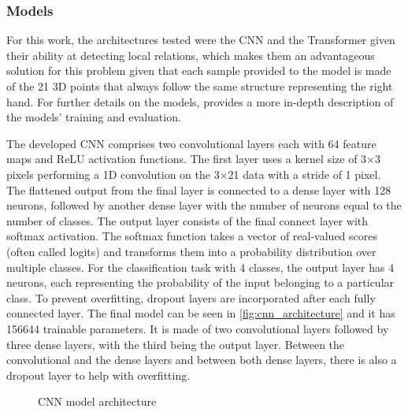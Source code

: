 \subsubsection{Models}

For this work, the architectures tested were the CNN and the Transformer given their ability at detecting local relations, which makes them an advantageous solution for this problem given that each sample provided to the model is made of the 21 3D points that always follow the same structure representing the right hand. For further details on the models, \textcite{Amaral2023} provides a more in-depth description of the models' training and evaluation.


The developed CNN comprises two convolutional layers each with 64 feature maps and ReLU activation functions.
The first layer uses a kernel size of 3$\times$3 pixels performing a 1D convolution on the 3$\times$21 data with a stride of 1 pixel. The flattened output from the final layer is connected to a dense layer with 128 neurons, followed by another dense layer with the number of neurons equal to the number of classes. The output layer consists of the final connect layer with softmax activation. The softmax function takes a vector of real-valued scores (often called logits) and transforms them into a probability distribution over multiple classes. For the classification task with 4 classes, the output layer has 4 neurons, each representing the probability of the input belonging to a particular class. To prevent overfitting, dropout layers are incorporated after each fully connected layer. The final model can be seen in \autoref{fig:cnn_architecture} and it has \num{156644} trainable parameters. It is made of two convolutional layers followed by three dense layers, with the third being the output layer. Between the convolutional and the dense layers and between both dense layers, there is also a dropout layer to help with overfitting.

\begin{figure}[ht]
    \centering
    {\fontsize{9}{11}\selectfont}
    \caption{CNN model architecture}
    \label{fig:cnn_architecture}
\end{figure}

